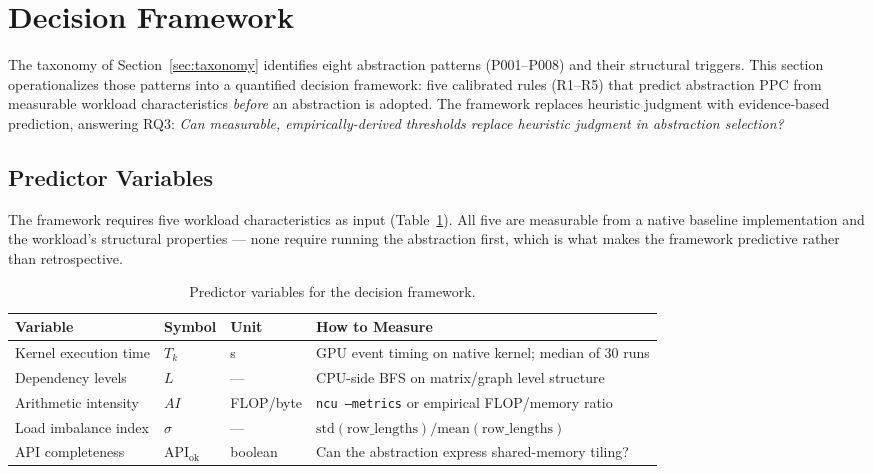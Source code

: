
\section{Decision Framework}
\label{sec:framework}

The taxonomy of Section~\ref{sec:taxonomy} identifies eight abstraction
patterns (P001--P008) and their structural triggers. This section
operationalizes those patterns into a quantified decision framework: five
calibrated rules (R1--R5) that predict abstraction PPC from measurable
workload characteristics \emph{before} an abstraction is adopted. The
framework replaces heuristic judgment with evidence-based prediction,
answering RQ3: \textit{Can measurable, empirically-derived thresholds replace
heuristic judgment in abstraction selection?}

\subsection{Predictor Variables}
\label{subsec:predictors}

The framework requires five workload characteristics as input
(Table~\ref{tab:predictors}). All five are measurable from a native baseline
implementation and the workload's structural properties --- none require
running the abstraction first, which is what makes the framework predictive
rather than retrospective.

\begin{table}[t]
\centering
\caption{Predictor variables for the decision framework.}
\label{tab:predictors}
\begin{tabular}{llll}
\hline
\textbf{Variable} & \textbf{Symbol} & \textbf{Unit}
& \textbf{How to Measure} \\
\hline
Kernel execution time & $T_k$ & \textmu{}s
& GPU event timing on native kernel; median of 30 runs \\
Dependency levels & $L$ & ---
& CPU-side BFS on matrix/graph level structure \\
Arithmetic intensity & $AI$ & FLOP/byte
& \texttt{ncu --metrics} or empirical FLOP/memory ratio \\
Load imbalance index & $\sigma$ & ---
& $\text{std}(\text{row\_lengths}) / \text{mean}(\text{row\_lengths})$ \\
API completeness & $\text{API}_{\text{ok}}$ & boolean
& Can the abstraction express shared-memory tiling? \\
\hline
\end{tabular}
\end{table}

